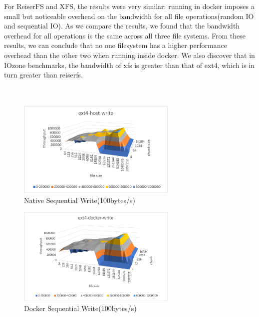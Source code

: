 \documentclass[letterpaper,twocolumn,10pt]{article}
\begin{document}
For ReiserFS and XFS, the results were very similar: running in docker imposes a small but noticeable overhead on the bandwidth for all file operations(random IO and sequential IO). As we compare the results, we found that the bandwidth overhead for all operations is the same across all three file systems. From these results, we can conclude that no one filesystem has a higher performance overhead than the other two when running inside docker. We also discover that in IOzone benchmarks, the bandwidth of xfs is greater than that of ext4, which is in turn greater than reiserfs.\\

\noindent{}
\\\\



\begin{figure}[!ht]
\centering
\includegraphics[width=3in]{../results/ext4-host-write.png}
\caption{Native Sequential Write(100bytes/s)}
\label{fig:ext4-host-write}
\end{figure}

\begin{figure}[!ht]
\centering
\includegraphics[width=3in]{../results/ext4-docker-write.png}
\caption{Docker Sequential Write(100bytes/s)}
\label{fig:ext4-docker-write}
\end{figure}
\end{document}
